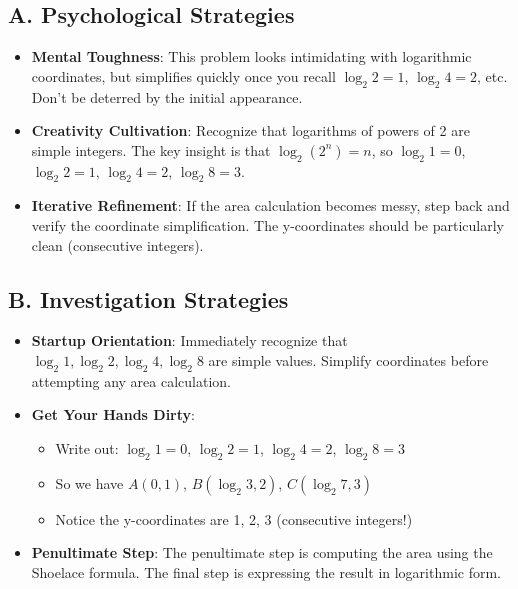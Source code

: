 \documentclass[12pt]{article}
\begin{document}
\begin{strategicbox}
\subsection*{A. Psychological Strategies}
\begin{itemize}[leftmargin=*]
    \item \textbf{Mental Toughness}: This problem looks intimidating with logarithmic coordinates, but simplifies quickly once you recall $\log_2 2 = 1$, $\log_2 4 = 2$, etc. Don't be deterred by the initial appearance.
    
    \item \textbf{Creativity Cultivation}: Recognize that logarithms of powers of 2 are simple integers. The key insight is that $\log_2(2^n) = n$, so $\log_2 1 = 0$, $\log_2 2 = 1$, $\log_2 4 = 2$, $\log_2 8 = 3$.
    
    \item \textbf{Iterative Refinement}: If the area calculation becomes messy, step back and verify the coordinate simplification. The y-coordinates should be particularly clean (consecutive integers).
\end{itemize}

\subsection*{B. Investigation Strategies}
\begin{itemize}[leftmargin=*]
    \item \textbf{Startup Orientation}: Immediately recognize that $\log_2 1, \log_2 2, \log_2 4, \log_2 8$ are simple values. Simplify coordinates before attempting any area calculation.
    
    \item \textbf{Get Your Hands Dirty}: 
    \begin{itemize}
        \item Write out: $\log_2 1 = 0$, $\log_2 2 = 1$, $\log_2 4 = 2$, $\log_2 8 = 3$
        \item So we have $A(0, 1)$, $B(\log_2 3, 2)$, $C(\log_2 7, 3)$
        \item Notice the y-coordinates are 1, 2, 3 (consecutive integers!)
    \end{itemize}
    
    \item \textbf{Penultimate Step}: The penultimate step is computing the area using the Shoelace formula. The final step is expressing the result in logarithmic form.
    

\end{itemize}
\end{strategicbox}
\end{document}
